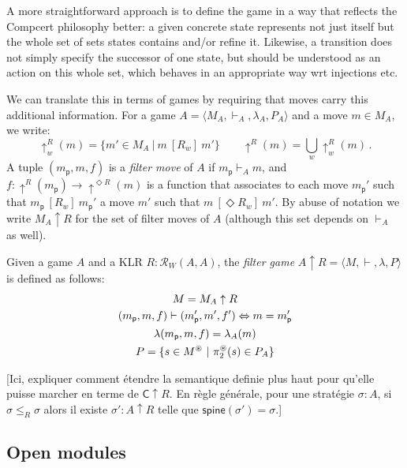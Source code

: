 \documentclass[acmsmall,anonymous]{acmart}
\newcommand{\kw}[1]{\ensuremath{ \textsf{#1} }}
\newcommand{\ifr}[1]{\ [{#1}]\ }
\newcommand{\EC}{\kw{C}}
\begin{document}
A more straightforward approach
is to define the game in a way that reflects
the Compcert philosophy better:
a given concrete state represents not just itself
but the whole set of sets states contains and/or refine it.
Likewise,
a transition does not simply specify the successor of one state,
but should be understood as an action on this whole set,
which behaves in an appropriate way
wrt injections etc.

We can translate this in terms of games
by requiring that moves carry this additional information.
For a game $A = \langle M_A, \vdash_A, \lambda_A, P_A \rangle$
and a move $m \in M_A$,
we write:
\[
  {\uparrow^R_w}(m) = \{ m' \in M_A \ |\ m \ifr{R_w} m' \} \hspace{2em}
  {\uparrow^R}(m) = \bigcup_w {\uparrow^R_w}(m) \,.
\]
A tuple $(m_\kw{p}, m, f)$ is a \emph{filter move} of $A$
if $m_\kw{p} \vdash_A m$,
and $f : {\uparrow^R}(m_\kw{p}) \rightarrow {\uparrow^{\Diamond R}}(m)$
is a function that associates
to each move $m_\kw{p}'$ such that $m_\kw{p} \ifr{R_w} m_\kw{p}'$
a move $m'$ such that $m \ifr{\Diamond R_w} m'$.
By abuse of notation we write $M_A \uparrow R$
for the set of filter moves of $A$
(although this set depends on $\vdash_A$ as well).

\begin{definition}
Given a game $A$ and a KLR $R : \mathcal{R}_W(A, A)$,
the \emph{filter game} $A \uparrow R = \langle M, \vdash, \lambda, P \rangle$
is defined as follows:
\begin{gather*}
  M = M_A \uparrow R \\
  (m_\kw{p}, m, f) \vdash (m_\kw{p}', m', f') \Leftrightarrow m = m_\kw{p}' \\
  \lambda(m_\kw{p}, m, f) = \lambda_A(m) \\
  P = \{ s \in M^\oast \ |\ \pi_2^\oast(s) \in P_A \}
\end{gather*}
\end{definition}

[Ici,
expliquer comment \'etendre la semantique definie plus haut
pour qu'elle puisse marcher en terme de $\EC \uparrow R$.
En r\`egle g\'en\'erale, pour
une strat\'egie $\sigma : A$,
si $\sigma \le_R \sigma$
alors il existe $\sigma' : A \uparrow R$
telle que $\kw{spine}(\sigma') = \sigma$.]

\subsection{Open modules} %
\end{document}
